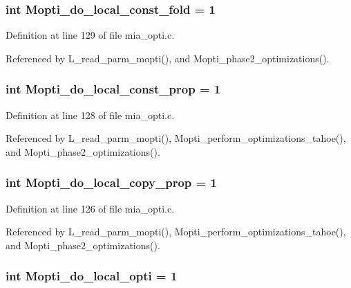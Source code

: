 \subsubsection{\setlength{\rightskip}{0pt plus 5cm}int \bf{Mopti\_\-do\_\-local\_\-const\_\-fold} = 1\hspace{0.3cm}{\tt  [static]}}\label{mia__opti_8c_5087c7715b6125da5a7ddba1849771b8}




Definition at line 129 of file mia\_\-opti.c.

Referenced by L\_\-read\_\-parm\_\-mopti(), and Mopti\_\-phase2\_\-optimizations().
\subsubsection{\setlength{\rightskip}{0pt plus 5cm}int \bf{Mopti\_\-do\_\-local\_\-const\_\-prop} = 1\hspace{0.3cm}{\tt  [static]}}\label{mia__opti_8c_155dcb4cd0276c909547111069daa448}




Definition at line 128 of file mia\_\-opti.c.

Referenced by L\_\-read\_\-parm\_\-mopti(), Mopti\_\-perform\_\-optimizations\_\-tahoe(), and Mopti\_\-phase2\_\-optimizations().
\subsubsection{\setlength{\rightskip}{0pt plus 5cm}int \bf{Mopti\_\-do\_\-local\_\-copy\_\-prop} = 1\hspace{0.3cm}{\tt  [static]}}\label{mia__opti_8c_dab9fc8b7eef6f82391c1a1bbba0af86}




Definition at line 126 of file mia\_\-opti.c.

Referenced by L\_\-read\_\-parm\_\-mopti(), Mopti\_\-perform\_\-optimizations\_\-tahoe(), and Mopti\_\-phase2\_\-optimizations().
\subsubsection{\setlength{\rightskip}{0pt plus 5cm}int \bf{Mopti\_\-do\_\-local\_\-opti} = 1\hspace{0.3cm}{\tt  [static]}}\label{mia__opti_8c_ecc68a11b0c65b24fdb4f45c54c07c56}




